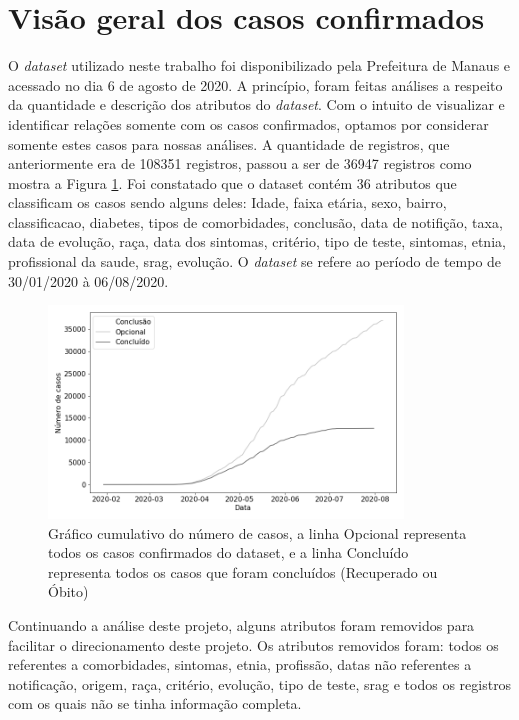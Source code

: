 \documentclass[12pt]{article}
\begin{document}
\section{Visão geral dos casos confirmados} \label{sec:visaogeral}
O \emph{dataset} utilizado neste trabalho foi disponibilizado pela Prefeitura de Manaus \cite{dataset-covid} e acessado no dia 6 de agosto de 2020. A princípio, foram feitas análises a respeito da quantidade e descrição dos atributos do \emph{dataset}. Com o intuito de visualizar e identificar relações somente com os casos confirmados, optamos por considerar somente estes casos para nossas análises. A quantidade de registros, que anteriormente era de 108351 registros, passou a ser de 36947 registros como mostra a Figura \ref{fig:lineplot}. Foi constatado que o dataset contém 36 atributos que classificam os casos sendo alguns deles: 
Idade, faixa etária, sexo, bairro, classificacao, diabetes, tipos de comorbidades, conclusão, data de notifição, taxa, data de evolução, raça, data dos sintomas, critério, tipo de teste, sintomas, etnia, profissional da saude, srag, evolução. O \emph{dataset} se refere ao período de tempo de 30/01/2020 à 06/08/2020. 

\begin{figure}[ht]
    \centering
    \includegraphics[width=0.84\textwidth]{lineplot_cumulativo.png}
    \caption{Gráfico cumulativo do número de casos, a linha Opcional representa todos os casos confirmados do dataset, e a linha Concluído representa todos os casos que foram concluídos (Recuperado ou Óbito)}
    \label{fig:lineplot}
\end{figure}
Continuando a análise deste projeto, alguns atributos foram removidos para facilitar o direcionamento deste projeto. Os atributos removidos foram: todos os referentes a comorbidades, sintomas, etnia, profissão, datas não referentes a notificação, origem, raça, critério, evolução, tipo de teste, srag e todos os registros com os quais não se tinha informação completa. 
\end{document}
